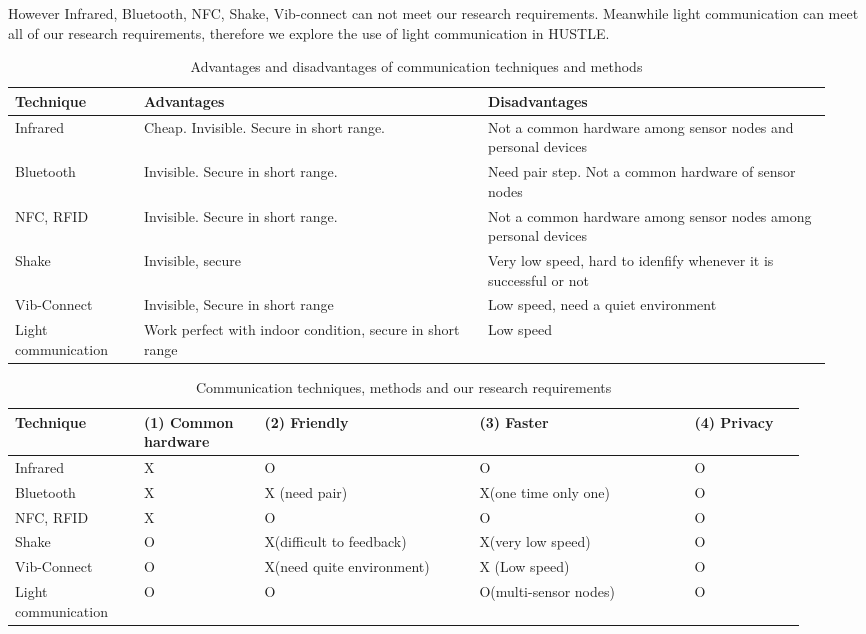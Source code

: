 However Infrared, Bluetooth, NFC, Shake, Vib-connect can not meet our research requirements. Meanwhile light communication can meet all of our research requirements, therefore we explore the use of light communication in HUSTLE.

\begin{table}[p]
\caption{Advantages and disadvantages of communication techniques and methods}
\begin{center}
\begin{tabular}{|p{0.15\linewidth}|p{0.4\linewidth}|p{0.4\linewidth}|}
\hline
Technique&Advantages&Disadvantages\\
\hline
Infrared&Cheap. Invisible. Secure in short range. &Not a common hardware among sensor nodes and personal devices\\
\hline
Bluetooth&Invisible. Secure in short range. & Need pair step. Not a common hardware of sensor nodes\\ 
\hline
NFC, RFID&Invisible. Secure in short range. & Not a common hardware among sensor nodes among personal devices\\
\hline
Shake&Invisible, secure& Very low speed, hard to idenfify whenever it is successful or not\\
\hline
Vib-Connect& Invisible, Secure in short range & Low speed, need a quiet environment\\
\hline
Light communication& Work perfect with indoor condition, secure in short range & Low speed\\
\hline
\end{tabular}
\end{center}
\label{tab:hustle_advance_disadvance_technique}
\end{table}%

\begin{table}[p]
\caption{Communication techniques, methods and our research requirements}
\begin{center}
\begin{tabular}{|p{0.15\linewidth}|p{0.14\linewidth}|p{0.25\linewidth}|p{0.25\linewidth}|p{0.13\linewidth}|}
\hline
Technique& (1) Common hardware & (2) Friendly& (3) Faster & (4) Privacy\\
\hline
Infrared& X & O & O & O\\
\hline
Bluetooth& X & X (need pair) & X(one time only one) & O\\
\hline
NFC, RFID& X & O & O & O\\
\hline
Shake& O & X(difficult to feedback) & X(very low speed) & O\\
\hline
Vib-Connect& O & X(need quite environment) & X (Low speed) & O\\
\hline
Light communication& O & O & O(multi-sensor nodes) & O\\
\hline
\end{tabular}
\end{center}
\label{tab:hustle_analyze_method_requirements}
\end{table}%


